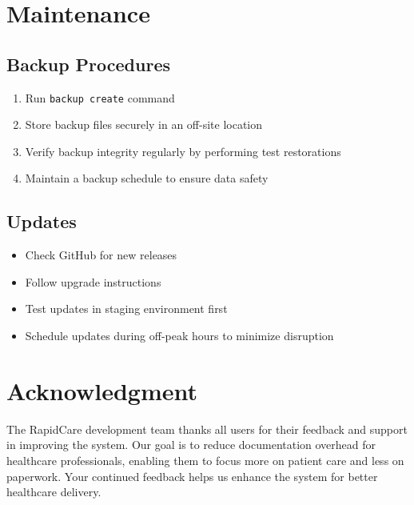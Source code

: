 \documentclass[12pt, titlepage]{article}
\begin{document}
\section{Maintenance}
\subsection{Backup Procedures}
\begin{enumerate}
\item Run \texttt{backup create} command
\item Store backup files securely in an off-site location
\item Verify backup integrity regularly by performing test restorations
\item Maintain a backup schedule to ensure data safety
\end{enumerate}

\subsection{Updates}
\begin{itemize}
\item Check GitHub for new releases
\item Follow upgrade instructions
\item Test updates in staging environment first
\item Schedule updates during off-peak hours to minimize disruption
\end{itemize}

\section*{Acknowledgment}
The RapidCare development team thanks all users for their feedback and support in improving the system. Our goal is to reduce documentation overhead for healthcare professionals, enabling them to focus more on patient care and less on paperwork. Your continued feedback helps us enhance the system for better healthcare delivery.
\end{document}
